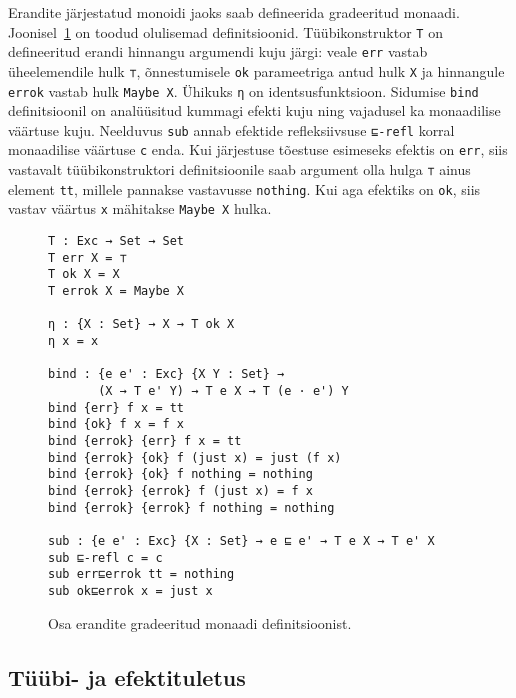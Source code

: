 \documentclass[a4paper,12pt]{article}
\begin{document}
Erandite järjestatud monoidi jaoks saab defineerida gradeeritud monaadi. Joonisel~\ref{fig:exc.graded-monad} on toodud olulisemad definitsioonid.
Tüübikonstruktor {\tt T} on defineeritud erandi hinnangu argumendi kuju järgi: veale {\tt err} vastab üheelemendile hulk {\tt ⊤}, õnnestumisele {\tt ok} parameetriga antud hulk {\tt X} ja hinnangule {\tt errok} vastab hulk {\tt Maybe X}.
Ühikuks {\tt η} on identsusfunktsioon.
Sidumise {\tt bind} definitsioonil on analüüsitud kummagi efekti kuju ning vajadusel ka monaadilise väärtuse kuju.
Neelduvus {\tt sub} annab efektide refleksiivsuse {\tt ⊑-refl} korral monaadilise väärtuse {\tt c} enda.
Kui järjestuse tõestuse esimeseks efektis on {\tt err}, siis vastavalt tüübikonstruktori definitsioonile saab argument olla hulga {\tt ⊤} ainus element {\tt tt}, millele pannakse vastavusse {\tt nothing}.
Kui aga efektiks on {\tt ok}, siis vastav väärtus {\tt x} mähitakse {\tt Maybe X} hulka.

\begin{figure}
  \begin{BVerbatim}
T : Exc → Set → Set
T err X = ⊤
T ok X = X
T errok X = Maybe X

η : {X : Set} → X → T ok X
η x = x
  
bind : {e e' : Exc} {X Y : Set} →
       (X → T e' Y) → T e X → T (e · e') Y
bind {err} f x = tt
bind {ok} f x = f x
bind {errok} {err} f x = tt
bind {errok} {ok} f (just x) = just (f x)
bind {errok} {ok} f nothing = nothing
bind {errok} {errok} f (just x) = f x
bind {errok} {errok} f nothing = nothing

sub : {e e' : Exc} {X : Set} → e ⊑ e' → T e X → T e' X
sub ⊑-refl c = c
sub err⊑errok tt = nothing
sub ok⊑errok x = just x
  \end{BVerbatim}
  \caption{Osa erandite gradeeritud monaadi definitsioonist.}
  \label{fig:exc.graded-monad}
\end{figure}

\subsection{Tüübi- ja efektituletus}\label{ssec:exc.inference}
\end{document}
